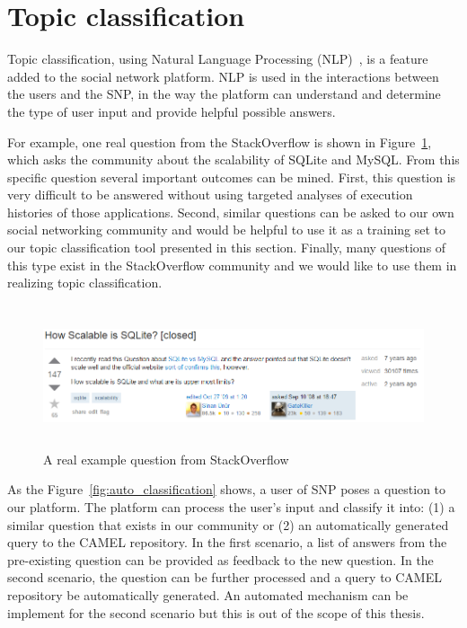 \section{Topic classification}
\label{sec:natural_implementation}
Topic classification, using Natural Language Processing (NLP)~\cite{manning1999foundations}, is a feature added to the social network platform. NLP is used in the interactions between the users and the SNP, in the way the platform can understand and determine the type of user input and provide helpful possible answers.

For example, one real question from the StackOverflow is shown in Figure~\ref{fig:so_question}, which asks the community about the scalability of SQLite and MySQL. From this specific question several important outcomes can be mined. First, this question is very difficult to be answered without using targeted analyses of execution histories of those applications. Second, similar questions can be asked to our own social networking community and would be helpful to use it as a training set to our topic classification tool presented in this section. Finally, many questions of this type exist in the StackOverflow community and we would like to use them in realizing topic classification.

\begin{figure}[h]
	\centering
	\includegraphics[width=1\textwidth,height=1.65in]{./fig/SOquestion.png}
	\caption{A real example question from StackOverflow}	
	\label{fig:so_question}
\end{figure}

As the Figure~\ref{fig:auto_classification} shows, a user of SNP poses a question to our platform. The platform can process the user's input and classify it into: (1) a similar question that exists in our community or (2) an automatically generated query to the CAMEL repository. In the first scenario, a list of answers from the pre-existing question can be provided as feedback to the new question. In the second scenario, the question can be further processed and a query to CAMEL repository be automatically generated. An automated mechanism can be implement for the second scenario but this is out of the scope of this thesis.  


